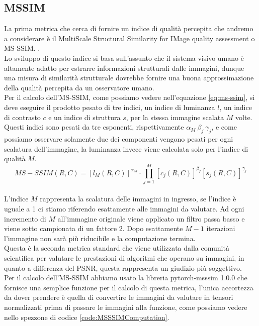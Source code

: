 \subsection{MSSIM}
La prima metrica che cerca di fornire un indice di qualità percepita che andremo a considerare è il MultiScale Structural Similarity for IMage quality assessment o MS-SSIM. \cite{wang2003multiscale}.\\
Lo sviluppo di questo indice si basa sull’assunto che il sistema visivo umano è altamente adatto per estrarre informazioni strutturali dalle immagini, dunque una misura di similarità strutturale dovrebbe fornire una buona approssimazione della qualità percepita da un osservatore umano.\\
Per il calcolo dell’MS-SSIM, come possiamo vedere nell’equazione \ref{eq:ms-ssim}, si deve eseguire il prodotto pesato di tre indici, un indice di luminanza $l$, un indice di contrasto $c$ e un indice di struttura $s$, per la stessa immagine scalata $M$ volte. Questi indici sono pesati da tre esponenti, rispettivamente $\alpha_{M}\:\beta_{j}\:\gamma_{j}$, e come possiamo osservare solamente due dei componenti vengono pesati per ogni scalatura dell’immagine, la luminanza invece viene calcolata solo per l’indice di qualità $M$.\\
\begin{equation}\label{eq:ms-ssim}
    MS-SSIM(R,C) = [l_{M}(R,C)]^{\alpha_{M}} \cdot \prod_{j=1}^{M}[c_{j}(R,C)]^{\beta_{j}} [s_{j}(R,C)]^{\gamma_{j}} 
\end{equation}\\
L’indice $M$ rappresenta la scalatura delle immagini in ingresso, se l’indice è uguale a 1 ci stiamo riferendo esattamente alle immagini da valutare. Ad ogni incremento di $M$ all’immagine originale viene applicato un filtro passa basso e viene sotto campionata di un fattore 2. Dopo esattamente $M-1$ iterazioni l’immagine non sarà più riducibile e la computazione termina.\\
Questa è la seconda metrica standard che viene utilizzata dalla comunità scientifica per valutare le prestazioni di algoritmi che operano su immagini, in quanto a differenza del PSNR, questa rappresenta un giudizio più soggettivo.\\
Per il calcolo dell’MS-SSIM abbiamo usato la libreria pytorch-msssim 1.0.0 che fornisce una semplice funzione per il calcolo di questa metrica, l’unica accortezza da dover prendere è quella di convertire le immagini da valutare in tensori normalizzati prima di passare le immagini alla funzione, come possiamo vedere nello spezzone di codice \ref{code:MSSSIMComputation}.\\
